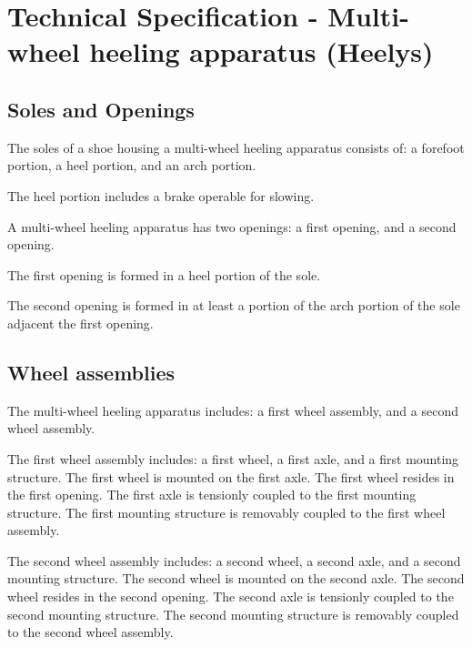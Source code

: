 \documentclass[
  draft,
]{tech-spec}
\begin{document}
  \chapter{Technical Specification - Multi-wheel heeling apparatus (Heelys)}

  \section*{Soles and Openings}
  \begin{parnumbers}
    The soles of a shoe housing a multi-wheel heeling apparatus consists of: a forefoot portion, a heel portion, and an arch portion.

    The heel portion includes a brake operable for slowing.

    A multi-wheel heeling apparatus has two openings: a first opening, and a second opening.

    The first opening is formed in a heel portion of the sole.

    The second opening is formed in at least a portion of the arch portion of the sole adjacent the first opening.
  \end{parnumbers}

  \section*{Wheel assemblies}
  \begin{parnumbers}
    The multi-wheel heeling apparatus includes: a first wheel assembly, and a second wheel assembly.

    The first wheel assembly includes: a first wheel, a first axle, and a first mounting structure. The first wheel is mounted on the first axle. The first wheel resides in the first opening. The first axle is tensionly coupled to the first mounting structure. The first mounting structure is removably coupled to the first wheel assembly.

    The second wheel assembly includes: a second wheel, a second axle, and a second mounting structure. The second wheel is mounted on the second axle. The second wheel resides in the second opening. The second axle is tensionly coupled to the second mounting structure. The second mounting structure is removably coupled to the second wheel assembly.
  \end{parnumbers}

\end{document}
